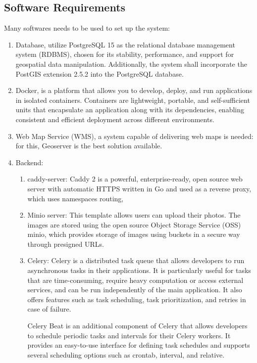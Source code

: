 \subsection{Software Requirements}\label{subsec:software-requirements}
Many softwares needs to be used to set up the system:
\begin{enumerate}
    \item Database, utilize PostgreSQL 15 as the relational database management system (RDBMS), chosen for its stability, performance, and support for geospatial data manipulation. Additionally, the system shall incorporate the PostGIS extension 2.5.2 into the PostgreSQL database.

    \item Docker, is a platform that allows you to develop, deploy, and run applications in isolated containers. Containers are lightweight, portable, and self-sufficient units that encapsulate an application along with its dependencies, enabling consistent and efficient deployment across different environments.
    
    \item Web Map Service (WMS), a system capable of delivering web maps is needed: for this, Geoserver is the best solution available.
    
    \item Backend:
    \begin{enumerate}
        \item caddy-server: Caddy 2 is a powerful, enterprise-ready, open source web server with automatic HTTPS written in Go and used as a reverse proxy, which uses namespaces routing,
        
        \item Minio server: This template allows users can upload their photos. The images are stored using the open source Object Storage Service (OSS) minio, which provides storage of images using buckets in a secure way through presigned URLs.
    
        \item Celery: Celery is a distributed task queue that allows developers to run asynchronous tasks in their applications. It is particularly useful for tasks that are time-consuming, require heavy computation or access external services, and can be run independently of the main application. It also offers features such as task scheduling, task prioritization, and retries in case of failure.
        
        Celery Beat is an additional component of Celery that allows developers to schedule periodic tasks and intervals for their Celery workers. It provides an easy-to-use interface for defining task schedules and supports several scheduling options such as crontab, interval, and relative.
    

\end{enumerate}
\end{enumerate}
